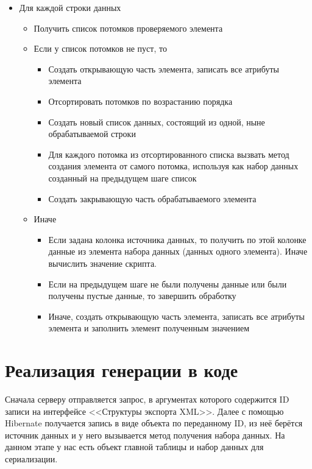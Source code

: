 \documentclass[a4paper,12pt]{diplom}
\begin{document}
\begin{itemize}
    \item Для каждой строки данных
        \begin{itemize}
            \item Получить список потомков проверяемого элемента
            \item Если у список потомков не пуст, то
                \begin{itemize}
                    \item Создать открывающую часть элемента, записать все атрибуты элемента
                    \item Отсортировать потомков по возрастанию порядка
                    \item Создать новый список данных, состоящий из одной, ныне обрабатываемой строки
                    \item Для каждого потомка из отсортированного списка вызвать метод создания элемента от самого потомка, используя как набор данных созданный на предыдущем шаге список
                    \item Создать закрывающую часть обрабатываемого элемента
                \end{itemize}
            \item Иначе
                \begin{itemize}
                    \item Если задана колонка источника данных, то получить по этой колонке данные из элемента набора данных (данных одного элемента). Иначе вычислить значение скрипта.
                    \item Если на предыдущем шаге не были получены данные или были получены пустые данные, то завершить обработку
                    \item Иначе, создать открывающую часть элемента, записать все атрибуты элемента и заполнить элемент полученным значением
                \end{itemize}
        \end{itemize}
\end{itemize}

\section{Реализация генерации в коде}

Сначала серверу отправляется запрос, в аргументах которого содержится ID записи на интерфейсе <<Структуры экспорта XML>>. Далее с помощью Hibernate получается запись в виде объекта по переданному ID, из неё берётся источник данных и у него вызывается метод получения набора данных. На данном этапе у нас есть объект главной таблицы и набор данных для сериализации.
\end{document}
